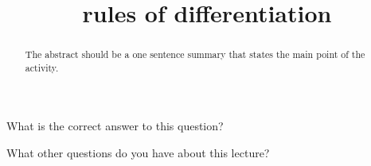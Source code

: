 \documentclass{ximera}
\title{rules of differentiation}
\begin{document}
\begin{abstract}
  The abstract should be a one sentence summary that states the main point of the activity.
\end{abstract}

\maketitle

\begin{question}
  What is the correct answer to this question?

  \begin{solution}
    \begin{multiple-choice}
    \end{multiple-choice}  
  \end{solution}
\end{question}

What other questions do you have about this lecture?
\begin{free-response}
\end{free-response}
\end{document}
